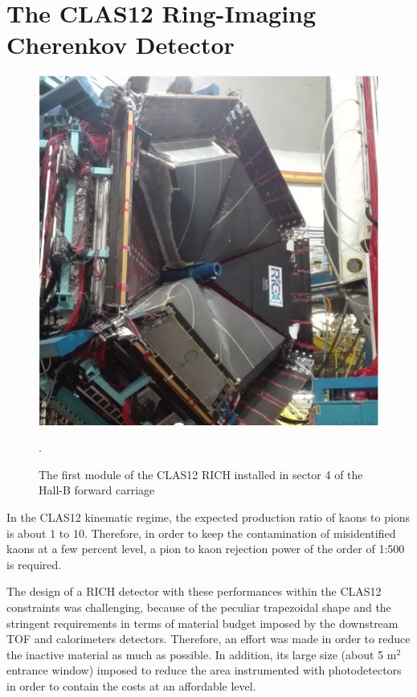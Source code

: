 \documentclass[final,5p,times,twocolumn]{elsarticle}
\begin{document}
\section{The CLAS12 Ring-Imaging Cherenkov Detector}

\begin{figure}[t]
\begin{center}
\includegraphics[width=0.80\columnwidth]{EPS/RICH_Installed.pdf}
\end{center}
\caption{The first module of the CLAS12 RICH installed in sector 4 of the Hall-B forward carriage}.
\label{Fig:RICHPic}
\end{figure}


In the CLAS12 kinematic regime, the expected production ratio of kaons to pions is about 1 to 10. Therefore, in order to 
keep the contamination of misidentified kaons at a few percent level, a pion to kaon rejection power of the order of 1:500 
is required.

The design of a RICH detector with these performances within the CLAS12 constraints was challenging, because of the peculiar 
trapezoidal shape and the stringent requirements in terms of material budget imposed by the downstream TOF and calorimeters 
detectors. Therefore, an effort was made in order to reduce the inactive material as much as possible. In addition, its large 
size (about 5 m$^2$ entrance window) imposed to reduce the area instrumented with photodetectors in order to contain the costs 
at an affordable level.
\end{document}
